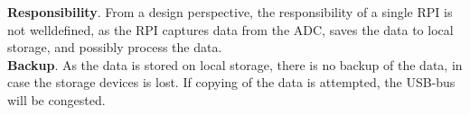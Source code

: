 \textbf{Responsibility}. From a design perspective, the responsibility of a single RPI is not welldefined, as the RPI captures data from the ADC, saves the data to local storage, and possibly process the data. \\

\textbf{Backup}. As the data is stored on local storage, there is no backup of the data, in case the storage devices is lost. If copying of the data is attempted, the USB-bus will be congested.